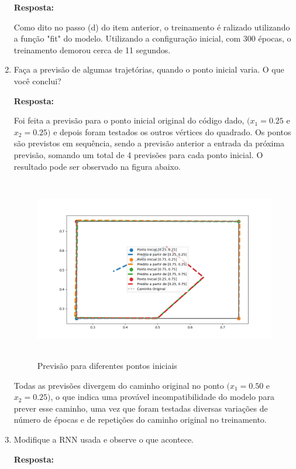 \documentclass[12 pt]{article}
\begin{document}
\begin{enumerate}
    \textbf{Resposta:} \par

    Como dito no passo (d) do item anterior, o treinamento é ralizado utilizando a função "fit" do modelo. Utilizando a configuração inicial, com 300 épocas, o treinamento demorou cerca de 11 segundos.


    \item Faça a previsão de algumas trajetórias, quando o ponto inicial varia. O que você conclui?
   
    \textbf{Resposta:} \par

    Foi feita a previsão para o ponto inicial original do código dado, $(x_1=0.25$ e $x_2=0.25)$ e depois foram testados os outros vértices do quadrado. Os pontos são previstos em sequência, sendo a previsão anterior a entrada da próxima previsão, somando um total de 4 previsões para cada ponto inicial. O resultado pode ser observado na figura abaixo.

    \begin{figure}[H]
        \caption{Previsão para diferentes pontos iniciais}
           \centering
           \includegraphics[height=8cm]{fig/Item_3.png}
    \end{figure}
    
    Todas as previsões divergem do caminho original no ponto $(x_1=0.50$ e $x_2=0.25)$, o que indica uma provável incompatibilidade do modelo para prever esse caminho, uma vez que foram testadas diversas variações de número de épocas e de repetições do caminho original no treinamento.

    \item Modifique a RNN usada e observe o que acontece.

    \textbf{Resposta:} \par


\end{enumerate}
\end{document}
